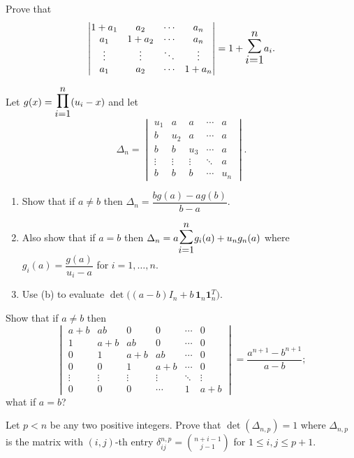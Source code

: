 \documentclass[12pt]{article}
\let\oldsum\sum
\let\oldprod\prod
\renewcommand{\sum}{\mathlarger{\mathlarger{\oldsum}}}
\renewcommand{\prod}{\mathlarger{\mathlarger{\oldprod}}}
\begin{document}
\begin{problem}
Prove that
\[
\begin{vmatrix}
1+a_1 & a_2 & \cdots & a_n\\
a_1 & 1+a_2 & \cdots & a_n\\
\vdots & \vdots & \ddots & \vdots\\
a_1 & a_2 & \cdots & 1+a_n
\end{vmatrix} = 1+\sum_{i=1}^n a_i.
\]
\end{problem}

\begin{problem}
Let $g(x)=\prod_{i=1}^n (u_i-x)$ and let
\[
\Delta_n = \begin{vmatrix}
u_1 & a & a & \cdots & a\\
b & u_2 & a & \cdots & a\\
b & b & u_3 & \cdots & a\\
\vdots & \vdots & \vdots & \ddots & a\\
b & b & b & \cdots & u_n
\end{vmatrix}.
\]
\begin{enumerate}[label=(\alph*)]
\item Show that if $a\ne b$ then $\Delta_n = \dfrac{bg(a)-ag(b)}{b-a}$.
\item Also show that if $a=b$ then $\Delta_n = a\sum_{i=1}^n g_i(a) + u_ng_n(a)$ where $g_i(a) = \dfrac{g(a)}{u_i-a}$ for $i=1,\dots,n$.
\item Use (b) to evaluate $\det\big((a-b)I_n + b\,\mathbf 1_n\mathbf 1_n^T\big)$.
\end{enumerate}
\end{problem}

\begin{problem}
Show that if $a\ne b$ then
\[
\begin{vmatrix}
a+b & ab & 0 & 0 & \cdots & 0\\
1 & a+b & ab & 0 & \cdots & 0\\
0 & 1 & a+b & ab & \cdots & 0\\
0 & 0 & 1 & a+b & \cdots & 0\\
\vdots & \vdots & \vdots & \vdots & \ddots & \vdots\\
0 & 0 & 0 & \cdots & 1 & a+b
\end{vmatrix} = \frac{a^{n+1}-b^{n+1}}{a-b};
\]
what if $a=b$?
\end{problem}

\begin{problem}
Let $p<n$ be any two positive integers. Prove that $\det(\Delta_{n,p})=1$ where $\Delta_{n,p}$ is the matrix with $(i,j)$-th entry $\delta_{ij}^{n,p} = \binom{n+i-1}{j-1}$ for $1\le i,j\le p+1$.
\end{problem}
\end{document}
